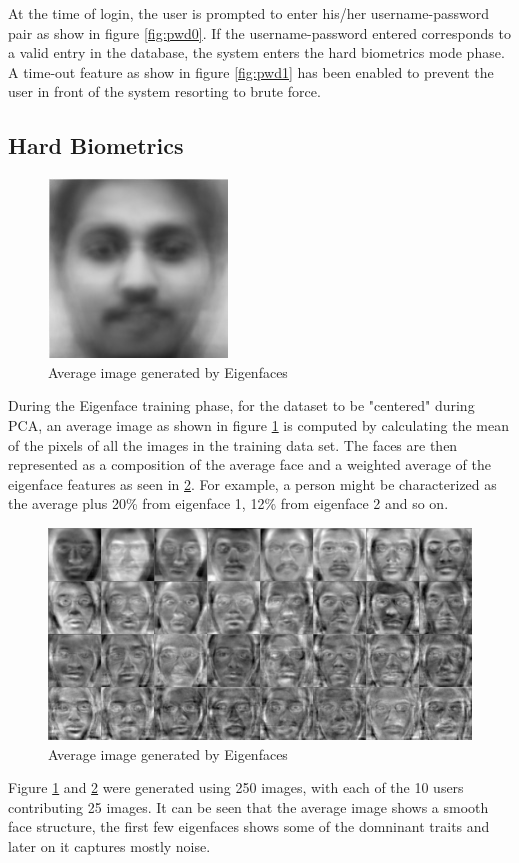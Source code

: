 \documentclass[%
        final,
        notitlepage,
        narroweqnarray,
        inline,
        ]{ieee}
\begin{document}
At the time of login, the user is prompted to enter his/her username-password pair as show  in figure \ref{fig:pwd0}.
If the username-password entered corresponds to a valid entry in the database, the system enters the hard biometrics mode phase.
A time-out feature as show in figure \ref{fig:pwd1} has been enabled to prevent the user in front of the system resorting to brute force. 

\subsection{Hard Biometrics}
\begin{figure}[h!]
	\centering
	\includegraphics[scale=0.5]{img/avg.jpeg}
	\caption{Average image generated by Eigenfaces}
	\label{fig:avg}
\end{figure}
During the Eigenface training phase, for the dataset to be "centered" during PCA, an average image as shown in figure \ref{fig:avg} is computed by calculating the mean of the pixels of all the images in the training data set. 
The faces are then represented as a composition of the average face and a weighted average of the eigenface features as seen in \ref{fig:eigen}.
For example, a person might be characterized as the average plus 20\% from eigenface 1, 12\% from eigenface 2 and so on.
\begin{figure}[h!]
	\centering
	\includegraphics[scale=0.15]{img/eigen.png}
	\caption{Average image generated by Eigenfaces}
	\label{fig:eigen}
\end{figure}
Figure \ref{fig:avg} and \ref{fig:eigen} were generated using 250 images, with each of the 10 users contributing 25 images.
It can be seen that the average image shows a smooth face structure, the first few eigenfaces shows some of the domninant traits and later on it captures mostly noise.
\end{document}
